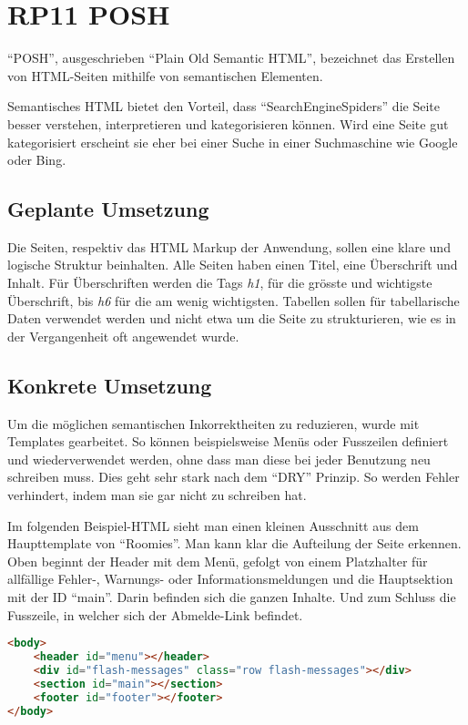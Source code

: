 \section{RP11 POSH}
\label{sec:principle-rp11-posh}

``POSH'', ausgeschrieben ``Plain Old Semantic HTML'', bezeichnet das Erstellen von HTML-Seiten mithilfe von semantischen Elementen. \cite{SemanticHTML}

Semantisches HTML bietet den Vorteil, dass ``\glspl{SearchEngineSpider}'' die Seite besser verstehen, interpretieren und kategorisieren können. Wird eine Seite gut kategorisiert erscheint sie eher bei einer Suche in einer Suchmaschine wie Google oder Bing.

\subsection*{Geplante Umsetzung}
Die Seiten, respektiv das HTML Markup der Anwendung, sollen eine klare und logische Struktur beinhalten.
Alle Seiten haben einen Titel, eine Überschrift und Inhalt.
Für Überschriften werden die Tags \emph{h1}, für die grösste und wichtigste Überschrift, bis \emph{h6} für die am wenig wichtigsten.
Tabellen sollen für tabellarische Daten verwendet werden und nicht etwa um die Seite zu strukturieren, wie es in der Vergangenheit oft angewendet wurde.

\subsection*{Konkrete Umsetzung}
Um die möglichen semantischen Inkorrektheiten zu reduzieren, wurde mit Templates gearbeitet. So können beispielsweise Menüs oder Fusszeilen definiert und wiederverwendet werden, ohne dass man diese bei jeder Benutzung neu schreiben muss. Dies geht sehr stark nach dem ``\gls{DRY}'' Prinzip. So werden Fehler verhindert, indem man sie gar nicht zu schreiben hat.

Im folgenden Beispiel-HTML sieht man einen kleinen Ausschnitt aus dem Haupttemplate von ``Roomies''. Man kann klar die Aufteilung der Seite erkennen. Oben beginnt der Header mit dem Menü, gefolgt von einem Platzhalter für allfällige Fehler-, Warnungs- oder Informationsmeldungen und die Hauptsektion mit der ID ``main''. Darin befinden sich die ganzen Inhalte. Und zum Schluss die Fusszeile, in welcher sich der Abmelde-Link befindet.

\begin{lstlisting}[language=HTML, caption=Layout Definition \cite{roomiesHtmlSkeleton}, label=lst:layoutDefinition, firstnumber=27]
<body>
	<header id="menu"></header>
	<div id="flash-messages" class="row flash-messages"></div>
	<section id="main"></section>
	<footer id="footer"></footer>
</body>
\end{lstlisting}

